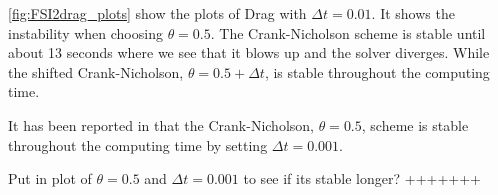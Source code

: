 \ref{fig:FSI2drag_plots} show the plots of Drag with $\Delta t = 0.01$. It shows the instability when choosing $\theta = 0.5$. The Crank-Nicholson scheme is stable until about 13 seconds where we see that it blows up and the solver diverges. While the shifted Crank-Nicholson, $\theta = 0.5 + \Delta t$, is stable throughout the computing time.\newline

It has been reported in \cite{Wick2011} that the Crank-Nicholson, $\theta = 0.5$, scheme is stable throughout the computing time by setting $\Delta t = 0.001$.

Put in plot of $\theta = 0.5$ and $\Delta t = 0.001$ to see if its stable longer? +++++++
